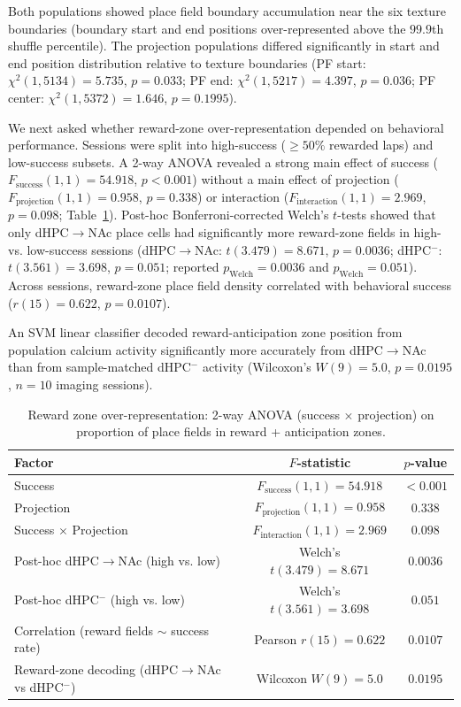\documentclass[11pt]{article}
\begin{document}
Both populations showed place field boundary accumulation near the six texture boundaries (boundary start and end positions over-represented above the $99.9$th shuffle percentile). The projection populations differed significantly in start and end position distribution relative to texture boundaries (PF start: $\chi^2(1,5134) = 5.735$, $p=0.033$; PF end: $\chi^2(1,5217) = 4.397$, $p=0.036$; PF center: $\chi^2(1,5372) = 1.646$, $p=0.1995$).

We next asked whether reward-zone over-representation depended on behavioral performance. Sessions were split into high-success ($\geq 50\%$ rewarded laps) and low-success subsets. A 2-way ANOVA revealed a strong main effect of success ($F_{\text{success}}(1,1) = 54.918$, $p<0.001$) without a main effect of projection ($F_{\text{projection}}(1,1) = 0.958$, $p=0.338$) or interaction ($F_{\text{interaction}}(1,1) = 2.969$, $p=0.098$; Table~\ref{tab:rewardzone}). Post-hoc Bonferroni-corrected Welch's $t$-tests showed that only dHPC$\to$NAc place cells had significantly more reward-zone fields in high- vs. low-success sessions (dHPC$\to$NAc: $t(3.479) = 8.671$, $p=0.0036$; dHPC$^-$: $t(3.561) = 3.698$, $p=0.051$; reported $p_{\text{Welch}} = 0.0036$ and $p_{\text{Welch}} = 0.051$). Across sessions, reward-zone place field density correlated with behavioral success ($r(15) = 0.622$, $p=0.0107$).

An SVM linear classifier decoded reward-anticipation zone position from population calcium activity significantly more accurately from dHPC$\to$NAc than from sample-matched dHPC$^-$ activity (Wilcoxon's $W(9) = 5.0$, $p = 0.0195$, $n=10$ imaging sessions).

\begin{table}[H]
\centering
\caption{Reward zone over-representation: 2-way ANOVA (success $\times$ projection) on proportion of place fields in reward + anticipation zones.}
\label{tab:rewardzone}
\begin{tabular}{lcc}
\toprule
Factor & $F$-statistic & $p$-value \\
\midrule
Success & $F_{\text{success}}(1,1) = 54.918$ & $<0.001$ \\
Projection & $F_{\text{projection}}(1,1) = 0.958$ & $0.338$ \\
Success $\times$ Projection & $F_{\text{interaction}}(1,1) = 2.969$ & $0.098$ \\
\midrule
Post-hoc dHPC$\to$NAc (high vs. low) & Welch's $t(3.479) = 8.671$ & $0.0036$ \\
Post-hoc dHPC$^-$ (high vs. low) & Welch's $t(3.561) = 3.698$ & $0.051$ \\
Correlation (reward fields $\sim$ success rate) & Pearson $r(15) = 0.622$ & $0.0107$ \\
Reward-zone decoding (dHPC$\to$NAc vs dHPC$^-$) & Wilcoxon $W(9) = 5.0$ & $0.0195$ \\
\bottomrule
\end{tabular}
\end{table}
\end{document}
